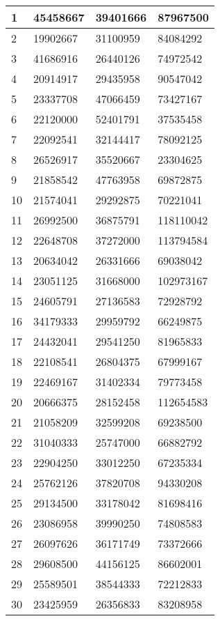 \begin{table}[ht!]
\begin{tabularx}{\textwidth}{l|X|X|X}
		1&	45458667	&	39401666	&	87967500	\\ \hline
		2&	19902667	&	31100959	&	84084292	\\ \hline
		3&	41686916	&	26440126	&	74972542	\\ \hline
		4&	20914917	&	29435958	&	90547042	\\ \hline
		5&	23337708	&	47066459	&	73427167	\\ \hline
		6&	22120000	&	52401791	&	37535458	\\ \hline
		7&	22092541	&	32144417	&	78092125	\\ \hline
		8&	26526917	&	35520667	&	23304625	\\ \hline
		9&	21858542	&	47763958	&	69872875	\\ \hline
		10&	21574041	&	29292875	&	70221041	\\ \hline
		11&	26992500	&	36875791	&	118110042	\\ \hline
		12&	22648708	&	37272000	&	113794584	\\ \hline
		13&	20634042	&	26331666	&	69038042	\\ \hline
		14&	23051125	&	31668000	&	102973167	\\ \hline
		15&	24605791	&	27136583	&	72928792	\\ \hline
		16&	34179333	&	29959792	&	66249875	\\ \hline
		17&	24432041	&	29541250	&	81965833	\\ \hline
		18&	22108541	&	26804375	&	67999167	\\ \hline
		19&	22469167	&	31402334	&	79773458	\\ \hline
		20&	20666375	&	28152458	&	112654583	\\ \hline
		21&	21058209	&	32599208	&	69238500	\\ \hline
		22&	31040333	&	25747000	&	66882792	\\ \hline
		23&	22904250	&	33012250	&	67235334	\\ \hline
		24&	25762126	&	37820708	&	94330208	\\ \hline
		25&	29134500	&	33178042	&	81698416	\\ \hline
		26&	23086958	&	39990250	&	74808583	\\ \hline
		27&	26097626	&	36171749	&	73372666	\\ \hline
		28&	29608500	&	44156125	&	86602001	\\ \hline
		29&	25589501	&	38544333	&	72212833	\\ \hline
		30&	23425959	&	26356833	&	83208958	\\ \hline

		\end{tabularx}
	\end{table}